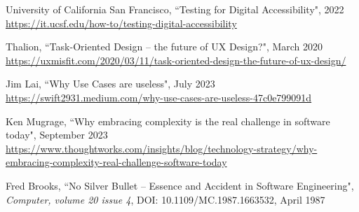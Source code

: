 \begin{thebibliography}{100}
 University of California San Francisco, ``Testing for Digital Accessibility", 2022
\href{https://it.ucsf.edu/how-to/testing-digital-accessibility}{https://it.ucsf.edu/how-to/testing-digital-accessibility}

 Thalion, ``Task-Oriented Design -- the future of UX Design?", March 2020
\href{https://uxmisfit.com/2020/03/11/task-oriented-design-the-future-of-ux-design/}{https://uxmisfit.com/2020/03/11/task-oriented-design-the-future-of-ux-design/}

 Jim Lai, ``Why Use Cases are useless", July 2023
\href{https://swift2931.medium.com/why-use-cases-are-useless-47c0e799091d}{https://swift2931.medium.com/why-use-cases-are-useless-47c0e799091d}

 Ken Mugrage, ``Why embracing complexity is the real challenge in software today", September 2023 
\href{https://www.thoughtworks.com/insights/blog/technology-strategy/why-embracing-complexity-real-challenge-software-today}{https://www.thoughtworks.com/insights/blog/technology-strategy/why-embracing-complexity-real-challenge-software-today}

 Fred Brooks, ``No Silver Bullet -- Essence and Accident in Software Engineering", 
\emph{Computer, volume 20 issue 4}, DOI: 10.1109/MC.1987.1663532, April 1987



\end{thebibliography}

